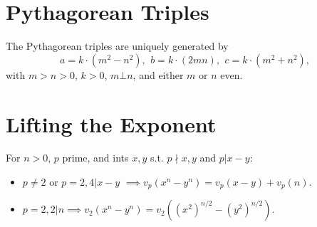 \section{Pythagorean Triples}
	 The Pythagorean triples are uniquely generated by
	 \[ a=k\cdot (m^{2}-n^{2}),\ \,b=k\cdot (2mn),\ \,c=k\cdot (m^{2}+n^{2}), \]
	 with $m > n > 0$, $k > 0$, $m \bot n$, and either $m$ or $n$ even.

\section{Lifting the Exponent}

For $n>0$, $p$ prime, and ints $x,y$ s.t. $p\nmid x,y$ and $p|x-y$:


\begin{itemize}
\item $p\neq 2$ or $p=2, 4|x-y$ $\implies v_p(x^n - y^n) = v_p(x - y) + v_p(n)$.
\item $p=2, 2|n \implies v_2(x^n-y^n)=v_2((x^2)^{n/2}-(y^2)^{n/2})$.
\end{itemize}
